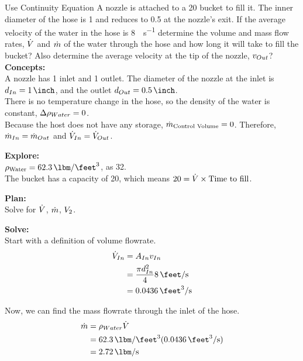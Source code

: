 \begin{example}{Use Continuity Equation}
  A nozzle is attached to a \SI{20}{\gallon} bucket to fill it.
  The inner diameter of the hose is \SI{1}{\inch} and reduces to \SI{0.5}{\inch} at the nozzle's exit.
  If the average velocity of the water in the hose is \SI{8}{\feet\per\second} determine the volume and mass flow rates, $\dot{V}$ and $\dot{m}$ of the water through the hose and how long it will take to fill the bucket?
  Also determine the average velocity at the tip of the nozzle, $v_{Out}$?
  \tcblower{}
  \textbf{Concepts:} \\
  A nozzle has 1 inlet and 1 outlet.
  The diameter of the nozzle at the inlet is $\Diameter_{In} = \SI{1}{\inch}$, and the outlet $\Diameter_{Out} = \SI{0.5}{\inch}$. \\
  There is no temperature change in the hose, so the density of the water is constant, $\Delta \rho_{Water} = 0$. \\
  Because the host does not have any storage, $\dot{m}_{\text{Control Volume}} = 0$.
  Therefore, $\dot{m}_{In} = \dot{m}_{Out}$ and $\dot{V}_{In} = \dot{V}_{Out}$.

  \textbf{Explore:} \\
  $\Density_{\text{Water}} = \SI{62.3}{\lbm\per\feet\cubed}$, as \SI{32}{\degreeF}. \\
  The bucket has a capacity of \SI{20}{\gallon}, which means $20 = \dot{V} \times \text{Time to fill}$.

  \textbf{Plan:} \\
  Solve for $\dot{V}$, $\dot{m}$, $V_{2}$.

  \textbf{Solve:} \\
  Start with a definition of volume flowrate.
  \begin{align*}
    \FlowRate{\Volume}_{In} &= \Area_{In} \Velocity_{In} \\
                            &= \frac{\pi \Diameter_{In}^{2}}{4} \SI{8}{\feet\per\second} \\
                            &= \SI{0.0436}{\cubic\feet\per\second}
  \end{align*}

  Now, we can find the mass flowrate through the inlet of the hose.
  \begin{align*}
    \FlowRate{\Mass} &= \Density_{Water} \FlowRate{\Volume} \\
                     &= \SI{62.3}{\lbm\per\feet\cubed} (\SI{0.0436}{\cubic\feet\per\second}) \\
                     &= \SI{2.72}{\lbm\per\second}
  \end{align*}


\end{example}

